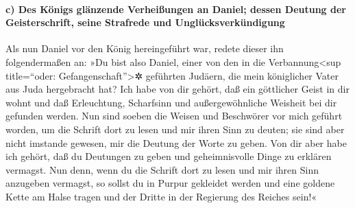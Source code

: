 \hypertarget{c-des-kuxf6nigs-gluxe4nzende-verheiuxdfungen-an-daniel-dessen-deutung-der-geisterschrift-seine-strafrede-und-ungluxfccksverkuxfcndigung}{%
\paragraph{c) Des Königs glänzende Verheißungen an Daniel; dessen
Deutung der Geisterschrift, seine Strafrede und
Unglücksverkündigung}\label{c-des-kuxf6nigs-gluxe4nzende-verheiuxdfungen-an-daniel-dessen-deutung-der-geisterschrift-seine-strafrede-und-ungluxfccksverkuxfcndigung}}

Als nun Daniel vor den König hereingeführt war, redete
dieser ihn folgendermaßen an: »Du bist also Daniel, einer von den in die
Verbannung\textless sup title=``oder: Gefangenschaft''\textgreater✲
geführten Judäern, die mein königlicher Vater aus Juda hergebracht hat?
Ich habe von dir gehört, daß ein göttlicher Geist in dir
wohnt und daß Erleuchtung, Scharfsinn und außergewöhnliche Weisheit bei
dir gefunden werden. Nun sind soeben die Weisen und
Beschwörer vor mich geführt worden, um die Schrift dort zu lesen und mir
ihren Sinn zu deuten; sie sind aber nicht imstande gewesen, mir die
Deutung der Worte zu geben. Von dir aber habe ich gehört,
daß du Deutungen zu geben und geheimnisvolle Dinge zu erklären vermagst.
Nun denn, wenn du die Schrift dort zu lesen und mir ihren Sinn anzugeben
vermagst, so sollst du in Purpur gekleidet werden und eine goldene Kette
am Halse tragen und der Dritte in der Regierung des Reiches sein!«

